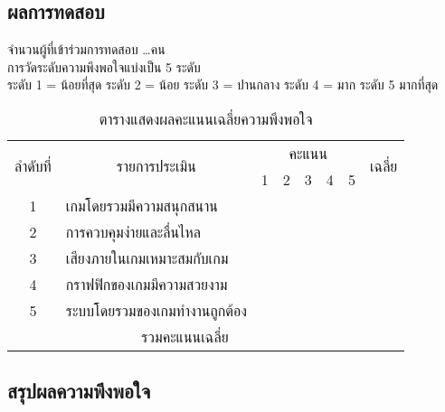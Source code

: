 \subsection{ผลการทดสอบ}
จำนวนผู้ที่เข้าร่วมการทดสอบ \dots คน
\\การวัดระดับความพึงพอใจแบ่งเป็น 5 ระดับ
\\ระดับ 1 = น้อยที่สุด \quad ระดับ 2 = น้อย \quad ระดับ 3 = ปานกลาง \quad ระดับ 4 = มาก \quad ระดับ 5 มากที่สุด
\\
\begin{table}[ht]
\begin{center}
    \begin{tabular}{|p{3cm}m{3cm}m{3cm}m{3cm}m{3cm}m{3cm}p{3cm}p{3cm}p{3cm}p{3cm}p{3cm}p{3cm}p{3cm}p{3cm}p{3cm}p{3cm}p{3cm}p{3cm}|}
        \hline
        \multicolumn{1}{|c|}{\multirow{2}{*}{ลำดับที่}} & \multicolumn{1}{c|}{\multirow{2}{*}{รายการประเมิน}} & \multicolumn{15}{c|}{คะแนน} & \multicolumn{1}{c|}{\multirow{2}{*}{เฉลี่ย}} \\ \cline{3-17}
        \multicolumn{1}{|c|}{} & \multicolumn{1}{l|}{} & \multicolumn{3}{l|}{1} & \multicolumn{3}{l|}{2} & \multicolumn{3}{l|}{3} & \multicolumn{3}{l|}{4} & \multicolumn{3}{l|}{5} & \multicolumn{1}{l|}{} \\ \hline
        \multicolumn{1}{|c|}{1} & \multicolumn{1}{l|}{เกมโดยรวมมีความสนุกสนาน} & \multicolumn{3}{l|}{} & \multicolumn{3}{l|}{} & \multicolumn{3}{l|}{} & \multicolumn{3}{l|}{} & \multicolumn{3}{l|}{} & \multicolumn{1}{l|}{} \\ \hline
        \multicolumn{1}{|c|}{2} & \multicolumn{1}{l|}{การควบคุมง่ายและลื่นไหล} & \multicolumn{3}{l|}{} & \multicolumn{3}{l|}{} & \multicolumn{3}{l|}{} & \multicolumn{3}{l|}{} & \multicolumn{3}{l|}{} & \multicolumn{1}{l|}{} \\ \hline
        \multicolumn{1}{|c|}{3} & \multicolumn{1}{l|}{เสียงภายในเกมเหมาะสมกับเกม} & \multicolumn{3}{l|}{} & \multicolumn{3}{l|}{} & \multicolumn{3}{l|}{} & \multicolumn{3}{l|}{} & \multicolumn{3}{l|}{} & \multicolumn{1}{l|}{} \\ \hline
        \multicolumn{1}{|c|}{4} & \multicolumn{1}{l|}{กราฟฟิกของเกมมีความสวยงาม} & \multicolumn{3}{l|}{} & \multicolumn{3}{l|}{} & \multicolumn{3}{l|}{} & \multicolumn{3}{l|}{} & \multicolumn{3}{l|}{} & \multicolumn{1}{l|}{} \\ \hline
        \multicolumn{1}{|c|}{5} & \multicolumn{1}{l|}{ระบบโดยรวมของเกมทำงานถูกต้อง} & \multicolumn{3}{l|}{} & \multicolumn{3}{l|}{} & \multicolumn{3}{l|}{} & \multicolumn{3}{l|}{} & \multicolumn{3}{l|}{} & \multicolumn{1}{l|}{} \\ \hline
        \multicolumn{17}{|c|}{รวมคะแนนเฉลี่ย} & \multicolumn{1}{c|}{} \\ \hline
    \end{tabular}
    \caption{ตารางแสดงผลคะแนนเฉลี่ยความพึงพอใจ}
\end{center}
\end{table}
\subsection{สรุปผลความพึงพอใจ}